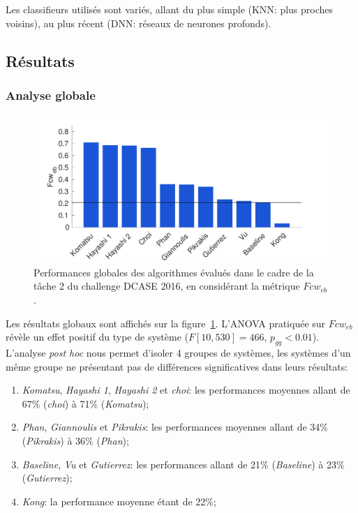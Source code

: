 Les classifieurs utilisés sont variés, allant du plus simple (KNN: plus proches voisins), au plus récent (DNN: réseaux de neurones profonds).

\subsection{Résultats}

\subsubsection{Analyse globale}
\label{sec:ch7_analyseGlobaleDcase2016}

\begin{figure}[t]
\includegraphics[width=1\textwidth]{gfx/ch_7/results_overall_eb_class_wise_average_F_6}
\caption{Performances globales des algorithmes évalués dans le cadre de la tâche 2 du challenge DCASE 2016, en considérant la métrique $Fcw_{eb}$.}
\label{fig:overall_eb_class_wise_F}
\end{figure}

Les résultats globaux sont affichés sur la figure~\ref{fig:overall_eb_class_wise_F}. L'ANOVA pratiquée sur $Fcw_{eb}$ révèle un effet positif du type de système ($F[10,530]=466$, $p_{gg}<0.01$). L'analyse \emph{post hoc} nous permet d'isoler 4 groupes de systèmes, les systèmes d'un même groupe ne présentant pas de différences significatives dans leurs résultats:

\begin{enumerate}
\item \emph{Komatsu}, \emph{Hayashi 1}, \emph{Hayashi 2} et \emph{choi}: les performances moyennes allant de 67\% (\emph{choi}) à 71\% (\emph{Komatsu});
\item \emph{Phan}, \emph{Giannoulis} et \emph{Pikrakis}: les performances moyennes allant de 34\% (\emph{Pikrakis}) à 36\% (\emph{Phan});
\item \emph{Baseline}, \emph{Vu} et \emph{Gutierrez}: les performances allant de 21\% (\emph{Baseline}) à 23\% (\emph{Gutierrez});
\item \emph{Kong}: la performance moyenne étant de 22\%;
\end{enumerate}

